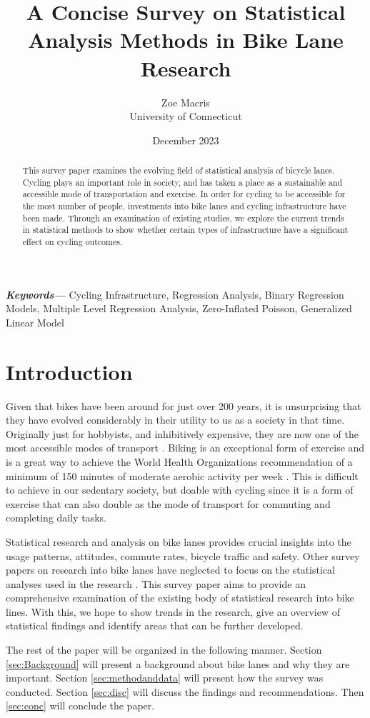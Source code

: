 \documentclass[12pt, letterpaper]{article}
\providecommand{\keywords}[1]
{
  \small	
  \textbf{\textit{Keywords---}} #1
}
\begin{document}
{\title{\bf A Concise Survey on Statistical Analysis Methods in Bike Lane Research}
  \author{Zoe Macris\\
  University of Connecticut}
\date{December 2023}
  \maketitle} 

\begin{abstract}
This survey paper examines the evolving field of statistical analysis of bicycle lanes. Cycling plays an important role in society, and has taken a place as a sustainable and accessible mode of transportation and exercise. In order for cycling to be accessible for the most number of people, investments into bike lanes and cycling infrastructure have been made. Through an examination of existing studies, we explore the current trends in statistical methods to show whether certain types of infrastructure have a significant effect on cycling outcomes. 
\end{abstract}
\label{sec:abstract}

\keywords{Cycling Infrastructure, Regression Analysis, Binary Regression Models, Multiple Level Regression Analysis, Zero-Inflated Poisson, Generalized Linear Model}


\section{Introduction}
\label{sec:intro}

Given that bikes have been around for just over 200 years, it is unsurprising that they have evolved considerably in their utility to us as a society in that time. Originally just for hobbyists, and inhibitively expensive, they are now one of the most accessible modes of transport \cite{BIKE2023}. Biking is an exceptional form of exercise and is a great way to achieve the World Health Organizations recommendation of a minimum of 150 minutes of moderate aerobic activity per week \citep{WHO2020}. This is difficult to achieve in our sedentary society, but doable with cycling since it is a form of exercise that can also double as the mode of transport for commuting and completing daily tasks. \par
Statistical research and analysis on bike lanes provides crucial insights into the usage patterns, attitudes, commute rates, bicycle traffic and safety. Other survey papers on research into bike lanes have neglected to focus on the statistical analyses used in the research \cite{7Mlenberg2019}. This survey paper aims to provide an comprehensive examination of the existing body of statistical research into bike lines. With this, we hope to show trends in the research, give an overview of statistical findings and identify areas that can be further developed. \par
The rest of the paper will be organized in the following manner. Section \ref{sec:Background} will present a background about bike lanes and why they are important. Section \ref{sec:methodanddata} will present how the survey was conducted. Section \ref{sec:disc} will discuss the findings and recommendations. Then \ref{sec:conc} will conclude the paper.
\end{document}
